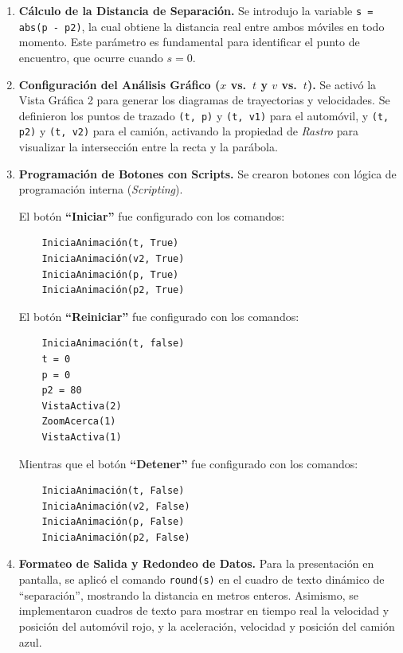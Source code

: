\begin{enumerate}
    \item \textbf{Cálculo de la Distancia de Separación.}
    Se introdujo la variable \texttt{s = abs(p - p2)}, la cual obtiene la distancia real entre ambos móviles en todo momento. Este parámetro es fundamental para identificar el punto de encuentro, que ocurre cuando $s = 0$.

    \item \textbf{Configuración del Análisis Gráfico ($x$ vs.\ $t$ y $v$ vs.\ $t$).}
    Se activó la Vista Gráfica 2 para generar los diagramas de trayectorias y velocidades. Se definieron los puntos de trazado \texttt{(t, p)} y \texttt{(t, v1)} para el automóvil, y \texttt{(t, p2)} y \texttt{(t, v2)} para el camión, activando la propiedad de \textit{Rastro} para visualizar la intersección entre la recta y la parábola.

    \item \textbf{Programación de Botones con Scripts.}
    Se crearon botones con lógica de programación interna (\textit{Scripting}).

    El botón \textbf{``Iniciar''} fue configurado con los comandos:
    \begin{verbatim}
    IniciaAnimación(t, True)
    IniciaAnimación(v2, True)
    IniciaAnimación(p, True)
    IniciaAnimación(p2, True)
    \end{verbatim}
    \vspace{-20pt}

    El botón \textbf{``Reiniciar''} fue configurado con los comandos:
    \begin{verbatim}
    IniciaAnimación(t, false)
    t = 0
    p = 0
    p2 = 80
    VistaActiva(2)
    ZoomAcerca(1)
    VistaActiva(1)
    \end{verbatim}
    \vspace{-20pt}

    Mientras que el botón \textbf{``Detener''} fue configurado con los comandos:
    \begin{verbatim}
    IniciaAnimación(t, False)
    IniciaAnimación(v2, False)
    IniciaAnimación(p, False)
    IniciaAnimación(p2, False)
    \end{verbatim}
    \vspace{-20pt}

    \item \textbf{Formateo de Salida y Redondeo de Datos.}
    Para la presentación en pantalla, se aplicó el comando \texttt{round(s)} en el cuadro de texto dinámico de ``separación'', mostrando la distancia en metros enteros. Asimismo, se implementaron cuadros de texto para mostrar en tiempo real la velocidad y posición del automóvil rojo, y la aceleración, velocidad y posición del camión azul.
\end{enumerate}

